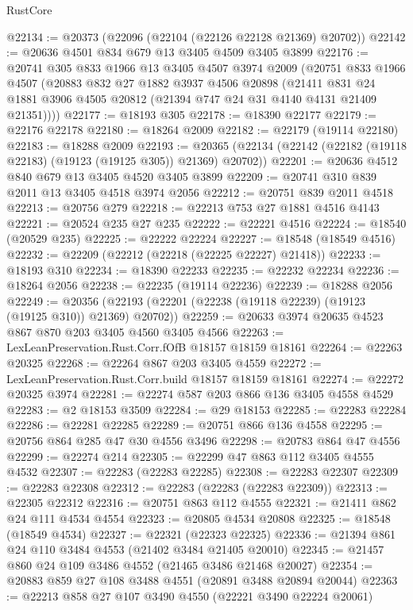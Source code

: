 \begin{lexlean}{RustCore}
\begin{coremodule}
@22134 := @20373 (@22096 (@22104 (@22126 @22128 @21369) @20702))
@22142 := @20636 @4501 @834 @679 @13 @3405 @4509 @3405 @3899
@22176 := @20741
    @305
    @833
    @1966
    @13
    @3405
    @4507
    @3974
    @2009
    (@20751
      @833
      @1966
      @4507
      (@20883
        @832
        @27
        @1882
        @3937
        @4506
        @20898
        (@21411 @831 @24 @1881 @3906 @4505 @20812 (@21394 @747 @24 @31 @4140 @4131 @21409 @21351))))
@22177 := @18193 @305
@22178 := @18390 @22177
@22179 := @22176 @22178
@22180 := @18264 @2009
@22182 := @22179 (@19114 @22180)
@22183 := @18288 @2009
@22193 := @20365 (@22134 (@22142 (@22182 (@19118 @22183) (@19123 (@19125 @305)) @21369) @20702))
@22201 := @20636 @4512 @840 @679 @13 @3405 @4520 @3405 @3899
@22209 := @20741 @310 @839 @2011 @13 @3405 @4518 @3974 @2056
@22212 := @20751 @839 @2011 @4518
@22213 := @20756 @279
@22218 := @22213 @753 @27 @1881 @4516 @4143
@22221 := @20524 @235 @27 @235
@22222 := @22221 @4516
@22224 := @18540 (@20529 @235)
@22225 := @22222 @22224
@22227 := @18548 (@18549 @4516)
@22232 := @22209 (@22212 (@22218 (@22225 @22227) @21418))
@22233 := @18193 @310
@22234 := @18390 @22233
@22235 := @22232 @22234
@22236 := @18264 @2056
@22238 := @22235 (@19114 @22236)
@22239 := @18288 @2056
@22249 := @20356 (@22193 (@22201 (@22238 (@19118 @22239) (@19123 (@19125 @310)) @21369) @20702))
@22259 := @20633 @3974 @20635 @4523 @867 @870 @203 @3405 @4560 @3405 @4566
@22263 := LexLeanPreservation.Rust.Corr.fOfB @18157 @18159 @18161
@22264 := @22263 @20325
@22268 := @22264 @867 @203 @3405 @4559
@22272 := LexLeanPreservation.Rust.Corr.build @18157 @18159 @18161
@22274 := @22272 @20325 @3974
@22281 := @22274 @587 @203 @866 @136 @3405 @4558 @4529
@22283 := @2 @18153 @3509
@22284 := @29 @18153
@22285 := @22283 @22284
@22286 := @22281 @22285
@22289 := @20751 @866 @136 @4558
@22295 := @20756 @864 @285 @47 @30 @4556 @3496
@22298 := @20783 @864 @47 @4556
@22299 := @22274 @214
@22305 := @22299 @47 @863 @112 @3405 @4555 @4532
@22307 := @22283 (@22283 @22285)
@22308 := @22283 @22307
@22309 := @22283 @22308
@22312 := @22283 (@22283 (@22283 @22309))
@22313 := @22305 @22312
@22316 := @20751 @863 @112 @4555
@22321 := @21411 @862 @24 @111 @4534 @4554
@22323 := @20805 @4534 @20808
@22325 := @18548 (@18549 @4534)
@22327 := @22321 (@22323 @22325)
@22336 := @21394 @861 @24 @110 @3484 @4553 (@21402 @3484 @21405 @20010)
@22345 := @21457 @860 @24 @109 @3486 @4552 (@21465 @3486 @21468 @20027)
@22354 := @20883 @859 @27 @108 @3488 @4551 (@20891 @3488 @20894 @20044)
@22363 := @22213 @858 @27 @107 @3490 @4550 (@22221 @3490 @22224 @20061)

\end{coremodule}
\end{lexlean}
